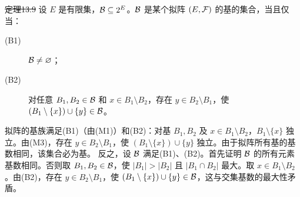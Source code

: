 \st{定理13.9} 设 $E$ 是有限集，$\mathcal B\subseteq2^E$。$\mathcal B$ 是某个拟阵 $(E,\mathcal F)$ 的基的集合，当且仅当：
\begin{description}
\item[(B1)] $\mathcal B\ne\varnothing$；
\item[(B2)] 对任意 $B_1,B_2\in\mathcal B$ 和 $x\in B_1\setminus B_2$，存在 $y\in B_2\setminus B_1$，使 $(B_1\setminus\{x\})\cup\{y\}\in\mathcal B$。
\end{description}
\pr 拟阵的基族满足(B1)（由(M1)）和(B2)：对基 $B_1,B_2$ 及 $x\in B_1\setminus B_2$，$B_1\setminus\{x\}$ 独立。由(M3)，存在 $y\in B_2\setminus B_1$，使 $(B_1\setminus\{x\})\cup\{y\}$ 独立。由于拟阵所有基的基数相同，该集合必为基。
反之，设 $\mathcal B$ 满足(B1)、(B2)。首先证明 $\mathcal B$ 的所有元素基数相同。否则取 $B_1,B_2\in\mathcal B$，使 $|B_1|>|B_2|$ 且 $|B_1\cap B_2|$ 最大。取 $x\in B_1\setminus B_2$。由(B2)，存在 $y\in B_2\setminus B_1$，使 $(B_1\setminus\{x\})\cup\{y\}\in\mathcal B$，这与交集基数的最大性矛盾。

